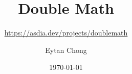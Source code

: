 \documentclass[a4paper,listof=totoc,openany,numbers=noenddot]{scrbook}
\title{Double Math}
\subtitle{\url{https://asdia.dev/projects/doublemath}}
\author{Eytan Chong}
\date{\today}
\begin{document}
\maketitle

\frontmatter



\cleardoubleemptypage

\tableofcontents

\mainmatter



\end{document}
